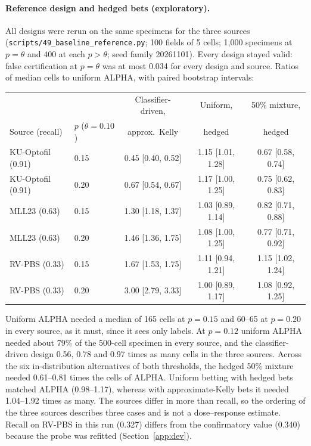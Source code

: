 \documentclass[11pt]{article}
\theoremstyle{remark}
\theoremstyle{definition}
\begin{document}
\paragraph{Reference design and hedged bets (exploratory).} All designs were rerun on the same specimens for the three sources (\texttt{scripts/49\_baseline\_reference.py}; 100 fields of 5 cells; 1,000 specimens at $p=\theta$ and 400 at each $p>\theta$; seed family 20261101). Every design stayed valid: false certification at $p=\theta$ was at most 0.034 for every design and source. Ratios of median cells to uniform ALPHA, with paired bootstrap intervals:
\begin{center}\small
\begin{tabular}{@{}llccc@{}}
\toprule
 & & Classifier-driven, & Uniform, & 50\% mixture,\\
Source (recall) & $p$ ($\theta=0.10$) & approx.\ Kelly & hedged & hedged\\
\midrule
KU-Optofil (0.91) & 0.15 & 0.45 [0.40, 0.52] & 1.15 [1.01, 1.28] & 0.67 [0.58, 0.74]\\
KU-Optofil (0.91) & 0.20 & 0.67 [0.54, 0.67] & 1.17 [1.00, 1.25] & 0.75 [0.62, 0.83]\\
MLL23 (0.63) & 0.15 & 1.30 [1.18, 1.37] & 1.03 [0.89, 1.14] & 0.82 [0.71, 0.88]\\
MLL23 (0.63) & 0.20 & 1.46 [1.36, 1.75] & 1.08 [1.00, 1.25] & 0.77 [0.71, 0.92]\\
RV-PBS (0.33) & 0.15 & 1.67 [1.53, 1.75] & 1.11 [0.94, 1.21] & 1.15 [1.02, 1.24]\\
RV-PBS (0.33) & 0.20 & 3.00 [2.79, 3.33] & 1.00 [0.89, 1.17] & 1.08 [0.92, 1.25]\\
\bottomrule
\end{tabular}
\end{center}
Uniform ALPHA needed a median of 165 cells at $p=0.15$ and 60--65 at $p=0.20$ in every source, as it must, since it sees only labels. At $p=0.12$ uniform ALPHA needed about 79\% of the 500-cell specimen in every source, and the classifier-driven design 0.56, 0.78 and 0.97 times as many cells in the three sources. Across the six in-distribution alternatives of both thresholds, the hedged 50\% mixture needed 0.61--0.81 times the cells of ALPHA. Uniform betting with hedged bets matched ALPHA (0.98--1.17), whereas with approximate-Kelly bets it needed 1.04--1.92 times as many. The sources differ in more than recall, so the ordering of the three sources describes three cases and is not a dose--response estimate. Recall on RV-PBS in this run (0.327) differs from the confirmatory value (0.340) because the probe was refitted (Section~\ref{app:dev}).
\end{document}
